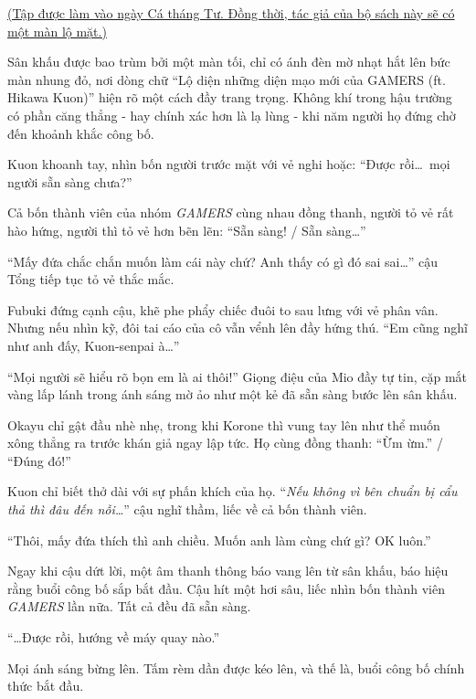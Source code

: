 \documentclass[../main.tex]{subfiles}
\begin{document}
\begin{center}
    \uline{(Tập được làm vào ngày Cá tháng Tư. Đồng thời, tác giả của bộ sách này sẽ có một màn lộ mặt.)}
\end{center}

Sân khấu được bao trùm bởi một màn tối, chỉ có ánh đèn mờ nhạt hắt lên bức màn nhung đỏ, nơi dòng chữ ``Lộ diện những diện mạo mới của GAMERS (ft. Hikawa Kuon)'' hiện rõ một cách đầy trang trọng. Không khí trong hậu trường có phần căng thẳng - hay chính xác hơn là lạ lùng - khi năm người họ đứng chờ đến khoảnh khắc công bố.


Kuon khoanh tay, nhìn bốn người trước mặt với vẻ nghi hoặc: ``Được rồi\dots\ mọi người sẵn sàng chưa?''

Cả bốn thành viên của nhóm \textit{GAMERS} cùng nhau đồng thanh, người tỏ vẻ rất hào hứng, người thì tỏ vẻ hơn bẽn lẽn: ``Sẵn sàng! / Sẵn sàng\dots''

``Mấy đứa chắc chắn muốn làm cái này chứ? Anh thấy có gì đó sai sai\dots'' cậu Tổng tiếp tục tỏ vẻ thắc mắc.

Fubuki đứng cạnh cậu, khẽ phe phẩy chiếc đuôi to sau lưng với vẻ phân vân. Nhưng nếu nhìn kỹ, đôi tai cáo của cô vẫn vểnh lên đầy hứng thú. ``Em cũng nghĩ như anh đấy, Kuon-senpai à\dots''

``Mọi người sẽ hiểu rõ bọn em là ai thôi!'' Giọng điệu của Mio đầy tự tin, cặp mắt vàng lấp lánh trong ánh sáng mờ ảo như một kẻ đã sẵn sàng bước lên sân khấu.

Okayu chỉ gật đầu nhè nhẹ, trong khi Korone thì vung tay lên như thể muốn xông thẳng ra trước khán giả ngay lập tức. Họ cùng đồng thanh: ``Ừm ừm.'' / ``Đúng đó!''

Kuon chỉ biết thở dài với sự phấn khích của họ. ``\textit{Nếu không vì bên chuẩn bị cẩu thả thì đâu đến nỗi\dots}'' cậu nghĩ thầm, liếc về cả bốn thành viên.

``Thôi, mấy đứa thích thì anh chiều. Muốn anh làm cùng chứ gì? OK luôn.''

Ngay khi cậu dứt lời, một âm thanh thông báo vang lên từ sân khấu, báo hiệu rằng buổi công bố sắp bắt đầu. Cậu hít một hơi sâu, liếc nhìn bốn thành viên \textit{GAMERS} lần nữa. Tất cả đều đã sẵn sàng.

``\dots Được rồi, hướng về máy quay nào.''

Mọi ánh sáng bừng lên. Tấm rèm dần được kéo lên, và thế là, buổi công bố chính thức bắt đầu.

\il
\end{document}
